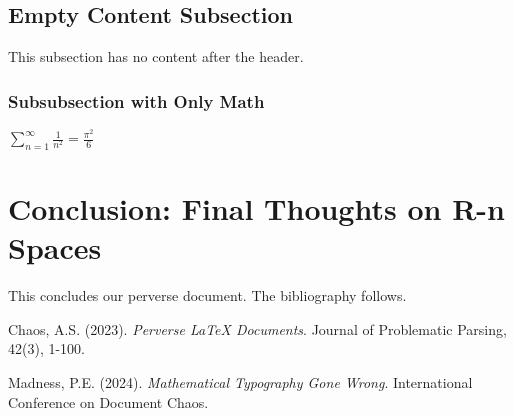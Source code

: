 \documentclass[12pt,a4paper]{article}
\begin{document}
\subsection{Empty Content Subsection}
This subsection has no content after the header.

\subsubsection{Subsubsection with Only Math}
$\sum_{n=1}^{\infty} \frac{1}{n^2} = \frac{\pi^2}{6}$

\section{Conclusion: Final Thoughts on R-n Spaces}
This concludes our perverse document. The bibliography follows.

\begin{thebibliography}{9}
Chaos, A.S. (2023). \emph{Perverse \LaTeX{} Documents}. Journal of Problematic Parsing, 42(3), 1-100.

Madness, P.E. (2024). \emph{Mathematical Typography Gone Wrong}. International Conference on Document Chaos.
\end{thebibliography}
\end{document}
